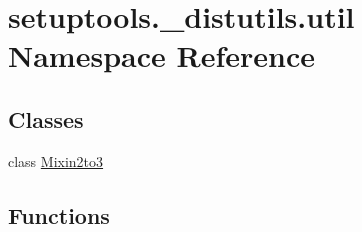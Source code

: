 \hypertarget{namespacesetuptools_1_1__distutils_1_1util}{}\section{setuptools.\+\_\+distutils.\+util Namespace Reference}
\label{namespacesetuptools_1_1__distutils_1_1util}
\subsection*{Classes}
\begin{DoxyCompactItemize}
\item 
class \hyperlink{classsetuptools_1_1__distutils_1_1util_1_1Mixin2to3}{Mixin2to3}
\end{DoxyCompactItemize}
\subsection*{Functions}
